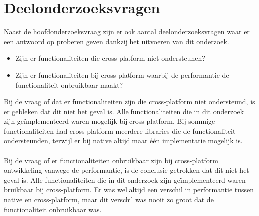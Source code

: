 \section{Deelonderzoeksvragen}
Naast de hoofdonderzoeksvraag zijn er ook aantal deelonderzoeksvragen waar er een antwoord op proberen 
geven dankzij het uitvoeren van dit onderzoek. 
\begin{itemize}
    \item Zijn er functionaliteiten die cross-platform niet ondersteunen?
    \item Zijn er functionaliteiten bij cross-platform waarbij de performantie de functionaliteit onbruikbaar maakt?
\end{itemize}
Bij de vraag of dat er functionaliteiten zijn die cross-platform niet ondersteund, 
is er gebleken dat dit niet het geval is. Alle functionaliteiten die in dit onderzoek zijn geïmplementeerd
waren mogelijk bij cross-platform. Bij sommige functionaliteiten had cross-platform meerdere libraries 
die de functionaliteit ondersteunden, terwijl er bij native altijd maar één implementatie mogelijk is.
\\\\
Bij de vraag of er functionaliteiten onbruikbaar zijn bij cross-platform ontwikkeling vanwege de performantie, 
is de conclusie getrokken dat dit niet het geval is. Alle functionaliteiten die in dit onderzoek zijn geïmplementeerd
waren bruikbaar bij cross-platform. Er was wel altijd een verschil in performantie tussen native en cross-platform,
maar dit verschil was nooit zo groot dat de functionaliteit onbruikbaar was.

